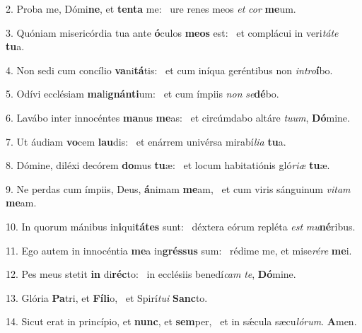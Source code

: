 2. Proba me, Dómi\textbf{ne}, et \textbf{ten}\textbf{ta} me: \ast\  ure renes meos \textit{et} \textit{cor} \textbf{me}um.\

3. Quóniam misericórdia tua ante \textbf{ó}culos \textbf{me}\textbf{os} est: \ast\  et complácui in veri\textit{tá}\textit{te} \textbf{tu}a.\

4. Non sedi cum concílio \textbf{va}ni\textbf{tá}tis: \ast\  et cum iníqua geréntibus non \textit{in}\textit{tro}\textbf{í}bo.\

5. Odívi ecclésiam \textbf{ma}li\textbf{gnán}\textbf{ti}um: \ast\  et cum ímpiis \textit{non} \textit{se}\textbf{dé}bo.\

6. Lavábo inter innocéntes \textbf{ma}nus \textbf{me}as: \ast\  et circúmdabo altáre \textit{tu}\textit{um}, \textbf{Dó}mine.\

7. Ut áudiam \textbf{vo}cem \textbf{lau}dis: \ast\  et enárrem univérsa mirabí\textit{li}\textit{a} \textbf{tu}a.\

8. Dómine, diléxi decórem \textbf{do}mus \textbf{tu}æ: \ast\  et locum habitatiónis gló\textit{ri}\textit{æ} \textbf{tu}æ.\

9. Ne perdas cum ímpiis, Deus, \textbf{á}nimam \textbf{me}am, \ast\  et cum viris sánguinum \textit{vi}\textit{tam} \textbf{me}am.\

10. In quorum mánibus in\textbf{i}qui\textbf{tá}\textbf{tes} sunt: \ast\  déxtera eórum repléta \textit{est} \textit{mu}\textbf{né}ribus.\

11. Ego autem in innocéntia \textbf{me}a in\textbf{grés}\textbf{sus} sum: \ast\  rédime me, et mise\textit{ré}\textit{re} \textbf{me}i.\

12. Pes meus stetit \textbf{in} di\textbf{réc}to: \ast\  in ecclésiis benedí\textit{cam} \textit{te}, \textbf{Dó}mine.\

13. Glória \textbf{Pa}tri, et \textbf{Fí}\textbf{li}o, \ast\  et Spirí\textit{tu}\textit{i} \textbf{Sanc}to.\

14. Sicut erat in princípio, et \textbf{nunc}, et \textbf{sem}per, \ast\  et in sǽcula sæcu\textit{ló}\textit{rum}. \textbf{A}men.\

